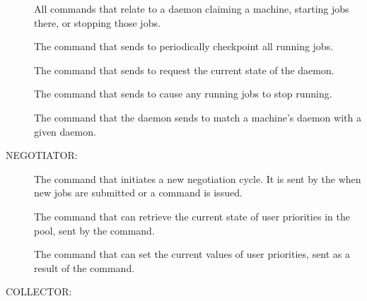 \begin{description}
\item[] 

All commands that relate to a  daemon claiming
  a machine, starting jobs there, or stopping those jobs.

The command that  sends to periodically checkpoint
  all running jobs.

\item[]

The command that  sends to request the
  current state of the  daemon.

\item[]
The command that  sends to cause
  any running jobs to stop running.

\item[]
The command that the  daemon sends to
  match a machine's  daemon with a given 
  daemon.
\end{description}

NEGOTIATOR:

\begin{description}
\item[]
The command that initiates a new negotiation
  cycle. It is sent by the  when new jobs are submitted
  or a  command is issued.

\item[]
The command that can retrieve the current state
  of user priorities in the pool, sent by the  command.

\item[]
The command that can set the current
  values of user priorities, sent as a result of the 
  command.
\end{description}

COLLECTOR:

